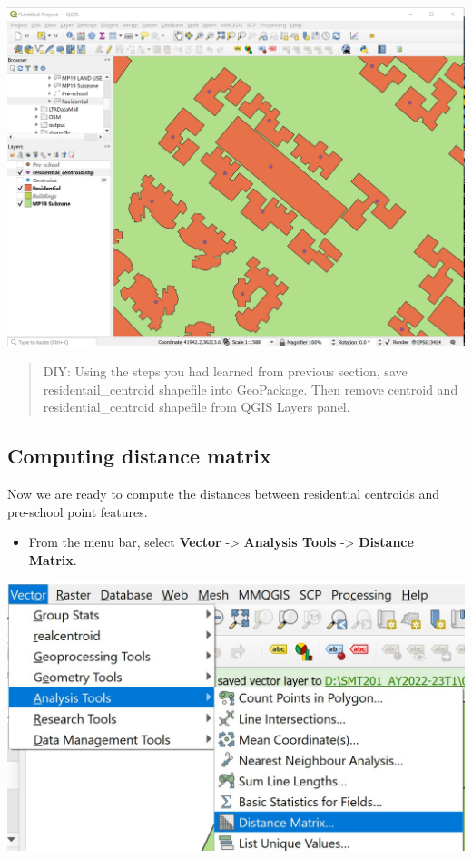 \documentclass[
  letterpaper,
  DIV=11,
  numbers=noendperiod]{scrreprt}
\providecommand{\tightlist}{%
  \setlength{\itemsep}{0pt}\setlength{\parskip}{0pt}}\usepackage{longtable,booktabs,array}
\begin{document}
\includegraphics{./img04/image115.jpg}

\begin{quote}
DIY: Using the steps you had learned from previous section, save
residentail\_centroid shapefile into GeoPackage. Then remove centroid
and residential\_centroid shapefile from QGIS Layers panel.
\end{quote}

\hypertarget{computing-distance-matrix}{%
\subsection{Computing distance matrix}\label{computing-distance-matrix}}

Now we are ready to compute the distances between residential centroids
and pre-school point features.

\begin{itemize}
\tightlist
\item
  From the menu bar, select \textbf{Vector} -\textgreater{}
  \textbf{Analysis Tools} -\textgreater{} \textbf{Distance Matrix}.
\end{itemize}

\includegraphics{./img04/image116.jpg}
\end{document}
